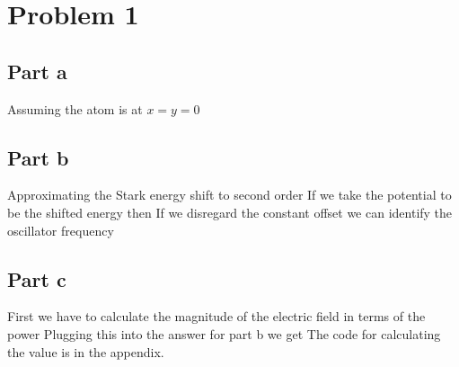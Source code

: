 \section*{Problem 1}
\subsection*{Part a}
Assuming the atom is at $x=y=0$
\subsection*{Part b}
Approximating the Stark energy shift to second order
If we take the potential to be the shifted energy then
If we disregard the constant offset we can identify the oscillator frequency
\subsection*{Part c}
First we have to calculate the magnitude of the electric field in terms of the power
Plugging this into the answer for part b we get
The code for calculating the value is in the appendix.
